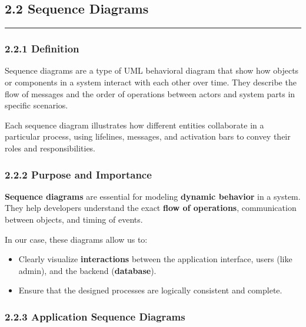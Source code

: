 \documentclass[12pt]{report}
\begin{document}
\subsection*{2.2 Sequence Diagrams}
\vspace{-0.3cm}
\rule{7.2cm}{1.2pt}
\vspace{-0.3cm}

\subsubsection*{2.2.1 Definition}
\vspace{0.1cm}

Sequence diagrams are a type of UML behavioral diagram that show how objects or components in a system interact with each other over time. They describe the flow of messages and the order of operations between actors and system parts in specific scenarios.

Each sequence diagram illustrates how different entities collaborate in a particular process, using lifelines, messages, and activation bars to convey their roles and responsibilities.

\subsubsection*{2.2.2 Purpose and Importance}
\vspace{0.1cm}


\textbf{Sequence diagrams} are essential for modeling \textbf{dynamic behavior} in a system. They help developers understand the exact \textbf{flow of operations}, communication between objects, and timing of events.

In our case, these diagrams allow us to:
\begin{itemize}
	\item Clearly visualize \textbf{interactions} between the application interface, users (like admin), and the backend (\textbf{database}).
	\item Ensure that the designed processes are logically consistent and complete.
\end{itemize}


\subsubsection*{2.2.3 Application Sequence Diagrams}
\vspace{0.1cm}
\end{document}
